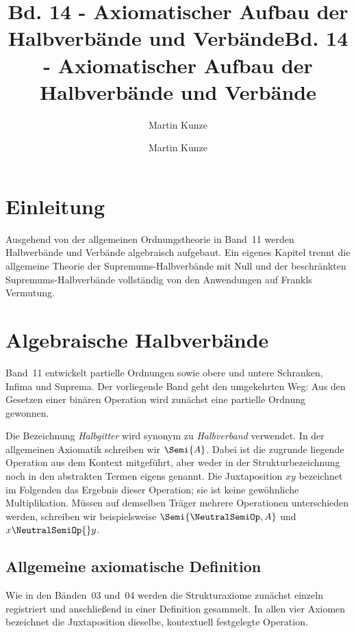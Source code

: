 \documentclass[main.tex]{subfiles}
\title{Bd. 14 - Axiomatischer Aufbau der Halbverbände und Verbände}
\author{Martin Kunze}
\date{}
\begin{document}
\title{Bd. 14 - Axiomatischer Aufbau der Halbverbände und Verbände}
\author{Martin Kunze}
\date{}
\hypersetup{pageanchor=false}
\maketitle
\hypersetup{pageanchor=true}
\setcounter{tocdepth}{3}
\tableofcontents
\setcounter{file}{14}
\renewcommand{\FormulaBandID}{14}

\chapter{Einleitung}

Ausgehend von der allgemeinen Ordnungstheorie in Band~11 werden
Halbverbände und Verbände algebraisch aufgebaut. Ein eigenes Kapitel trennt
die allgemeine Theorie der Supremums-Halbverbände mit Null und der
beschränkten Supremums-Halbverbände vollständig von den Anwendungen auf
Frankls Vermutung.

\chapter{Algebraische Halbverbände}

Band~11 entwickelt partielle Ordnungen sowie obere und untere Schranken,
Infima und Suprema. Der vorliegende Band geht den umgekehrten Weg: Aus den
Gesetzen einer binären Operation wird zunächst eine partielle Ordnung
gewonnen.

Die Bezeichnung \emph{Halbgitter} wird synonym zu \emph{Halbverband}
verwendet. In der allgemeinen Axiomatik schreiben wir \(\Semi{A}\). Dabei ist
die zugrunde liegende Operation aus dem Kontext mitgeführt, aber weder in der
Strukturbezeichnung noch in den abstrakten Termen eigens genannt. Die
Juxtaposition \(xy\) bezeichnet im Folgenden das Ergebnis dieser Operation;
sie ist keine gewöhnliche Multiplikation. Müssen auf demselben Träger mehrere
Operationen unterschieden werden, schreiben wir beispielsweise
\(\Semi{\NeutralSemiOp,A}\) und \(x\NeutralSemiOp{}y\).

\section{Allgemeine axiomatische Definition}

Wie in den Bänden~03 und~04 werden die Strukturaxiome zunächst einzeln
registriert und anschließend in einer Definition gesammelt. In allen vier
Axiomen bezeichnet die Juxtaposition dieselbe, kontextuell festgelegte
Operation.
\end{document}
